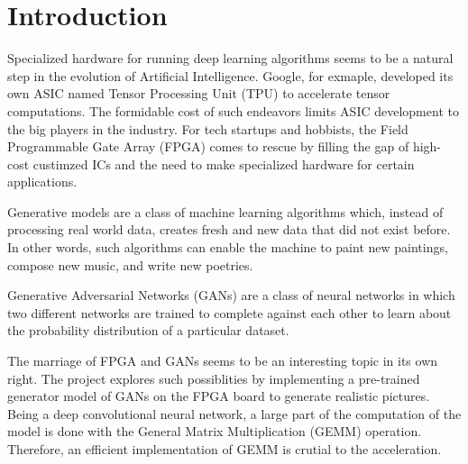 
\chapter{Introduction}

Specialized hardware for running deep learning algorithms seems to be a natural step in the evolution of
Artificial Intelligence.  Google, for exmaple, developed its own ASIC named Tensor Processing Unit (TPU)
to accelerate tensor computations. The formidable cost of such endeavors limits ASIC development to the big
players in the industry. For tech startups and hobbists, the Field Programmable Gate Array (FPGA) comes to
rescue by filling the gap of high-cost custimzed ICs and the need to make specialized hardware for certain
applications.

Generative models are a class of machine learning algorithms which, instead of processing real world data,
creates fresh and new data that did not exist before. In other words, such algorithms can enable the machine
to paint new paintings, compose new music, and write new poetries.

Generative Adversarial Networks (GANs) are a class of neural networks in which two different networks are
trained to complete against each other to learn about the probability distribution of a particular dataset.

The marriage of FPGA and GANs seems to be an interesting topic in its own right. The project explores such
possiblities by implementing a pre-trained generator model of GANs on the FPGA board to generate realistic
pictures. Being a deep convolutional neural network, a large part of the computation of the model is done
with the General Matrix Multiplication (GEMM) operation. Therefore, an efficient implementation of GEMM
is crutial to the acceleration.

\clearpage %
